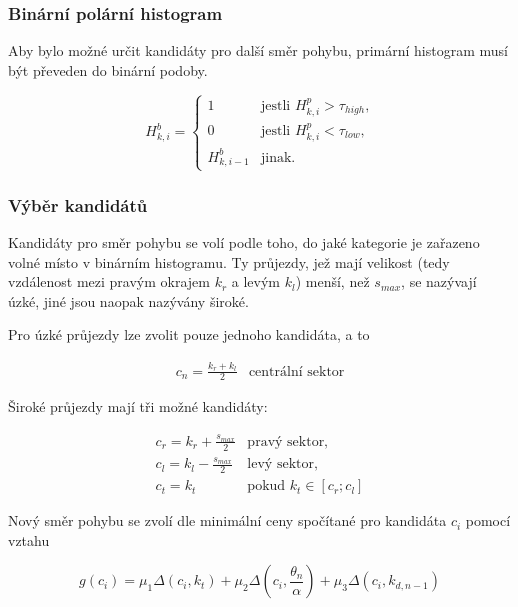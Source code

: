 \documentclass[twoside]{ctuthesis}
\theoremstyle{plain}
\theoremstyle{definition}
\theoremstyle{note}
\begin{document}
\subsubsection{Binární polární histogram}

Aby bylo možné určit kandidáty pro další směr pohybu, primární histogram musí být převeden do binární podoby.

$$H_{k,i}^{b} = \left\{
\begin{array}{ll}
1&\textrm{jestli $H_{k,i}^p > \tau_{high}$,}\\
0&\textrm{jestli $H_{k,i}^p < \tau_{low}$,}\\
H_{k, i-1}^b&\textrm{jinak.}
\end{array}
\right.
$$

\subsubsection{Výběr kandidátů}

Kandidáty pro směr pohybu se volí podle toho, do jaké kategorie je zařazeno volné místo v binárním histogramu. Ty průjezdy, jež mají velikost (tedy vzdálenost mezi pravým okrajem $k_r$ a levým $k_l$) menší, než $s_{max}$, se nazývají úzké, jiné jsou naopak nazývány široké.

Pro úzké průjezdy lze zvolit pouze jednoho kandidáta, a to 

$$\begin{array}{ll}
c_n = \frac{k_r + k_l}{2}&\textrm{centrální sektor}
\end{array}$$

Široké průjezdy mají tři možné kandidáty:

$$\begin{array}{ll}
c_r = k_r + \frac{s_{max}}{2}&\textrm{pravý sektor,}\\

c_l = k_l - \frac{s_{max}}{2}&\textrm{levý sektor,}\\

c_t = k_t&\textrm{pokud $k_t \in \left[c_r;c_l\right]$}
\end{array}$$

Nový směr pohybu se zvolí dle minimální ceny spočítané pro kandidáta $c_i$ pomocí vztahu

\begin{equation}
g(c_i) = \mu_1 \Delta\left(c_i, k_t\right) + \mu_2\Delta\left(c_i, \frac{\theta_n}{\alpha}\right) + \mu_3\Delta\left(c_i, k_{d, n-1}\right)
\end{equation}
\end{document}

